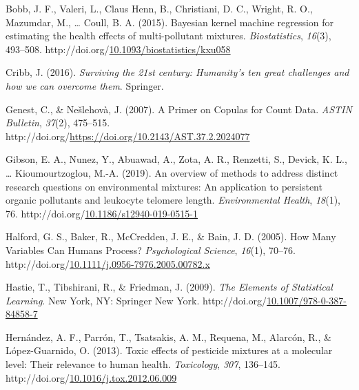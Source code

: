 \documentclass[12pt, twoside]{amherstthesis}
\newenvironment{CSLReferences}[2]%
  {}%
  {\par}
\begin{document}
\begin{CSLReferences}{1}{0}
\leavevmode{}%
Bobb, J. F., Valeri, L., Claus Henn, B., Christiani, D. C., Wright, R. O., Mazumdar, M., \ldots{} Coull, B. A. (2015). Bayesian kernel machine regression for estimating the health effects of multi-pollutant mixtures. \emph{Biostatistics}, \emph{16}(3), 493--508. http://doi.org/\href{https://doi.org/10.1093/biostatistics/kxu058}{10.1093/biostatistics/kxu058}

\leavevmode{}%
Cribb, J. (2016). \emph{Surviving the 21st century: {Humanity}'s ten great challenges and how we can overcome them}. Springer.

\leavevmode{}%
Genest, C., \& Nešlehovà, J. (2007). A {Primer} on {Copulas} for {Count} {Data}. \emph{ASTIN Bulletin}, \emph{37}(2), 475--515. http://doi.org/\url{https://doi.org/10.2143/AST.37.2.2024077}

\leavevmode{}%
Gibson, E. A., Nunez, Y., Abuawad, A., Zota, A. R., Renzetti, S., Devick, K. L., \ldots{} Kioumourtzoglou, M.-A. (2019). An overview of methods to address distinct research questions on environmental mixtures: An application to persistent organic pollutants and leukocyte telomere length. \emph{Environmental Health}, \emph{18}(1), 76. http://doi.org/\href{https://doi.org/10.1186/s12940-019-0515-1}{10.1186/s12940-019-0515-1}

\leavevmode{}%
Halford, G. S., Baker, R., McCredden, J. E., \& Bain, J. D. (2005). How {Many} {Variables} {Can} {Humans} {Process}? \emph{Psychological Science}, \emph{16}(1), 70--76. http://doi.org/\href{https://doi.org/10.1111/j.0956-7976.2005.00782.x}{10.1111/j.0956-7976.2005.00782.x}

\leavevmode{}%
Hastie, T., Tibshirani, R., \& Friedman, J. (2009). \emph{The {Elements} of {Statistical} {Learning}}. New York, NY: Springer New York. http://doi.org/\href{https://doi.org/10.1007/978-0-387-84858-7}{10.1007/978-0-387-84858-7}

\leavevmode{}%
Hernández, A. F., Parrón, T., Tsatsakis, A. M., Requena, M., Alarcón, R., \& López-Guarnido, O. (2013). Toxic effects of pesticide mixtures at a molecular level: {Their} relevance to human health. \emph{Toxicology}, \emph{307}, 136--145. http://doi.org/\href{https://doi.org/10.1016/j.tox.2012.06.009}{10.1016/j.tox.2012.06.009}


\end{CSLReferences}
\end{document}
